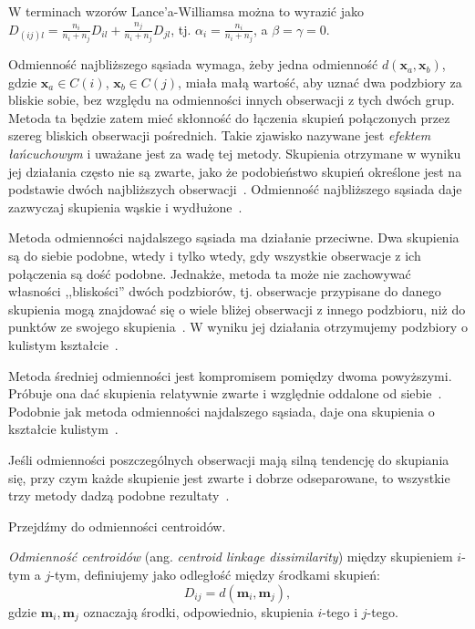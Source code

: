 \documentclass{praca1}
\begin{document}
W terminach wzorów Lance'a-Williamsa można to wyrazić jako $D_{(ij)l} = \frac{n_i}{n_i+n_j} D_{il} + \frac{n_j}{n_i+n_j} D_{jl}$, tj. $\alpha_i = \frac{n_i}{n_i+n_j}$, a $\beta = \gamma = 0$.

Odmienność najbliższego sąsiada wymaga, żeby jedna odmienność $d(\mathbf{x}_a, \mathbf{x}_b)$, gdzie $\mathbf{x}_a \in C(i)$, $\mathbf{x}_b \in C(j)$, miała małą wartość, aby uznać dwa podzbiory za bliskie sobie, bez względu na odmienności innych obserwacji z tych dwóch grup. Metoda ta będzie zatem mieć skłonność do łączenia skupień połączonych przez szereg bliskich obserwacji pośrednich. Takie zjawisko nazywane jest \emph{efektem łańcuchowym} i uważane jest za wadę tej metody. Skupienia otrzymane w wyniku jej działania często nie są zwarte, jako że podobieństwo skupień określone jest na podstawie dwóch najbliższych obserwacji~\cite{Hastie2009:elements}. Odmienność najbliższego sąsiada daje zazwyczaj skupienia wąskie i wydłużone~\cite{Koronacki2005:statystyczne}. 

Metoda odmienności najdalszego sąsiada ma działanie przeciwne. Dwa skupienia są do siebie podobne, wtedy i tylko wtedy, gdy wszystkie obserwacje z ich połączenia są dość podobne. Jednakże, metoda ta może nie zachowywać własności ,,bliskości'' dwóch podzbiorów, tj. obserwacje przypisane do danego skupienia mogą znajdować się o wiele bliżej obserwacji z innego podzbioru, niż do punktów ze swojego skupienia~\cite{Hastie2009:elements}. W wyniku jej działania otrzymujemy podzbiory o kulistym kształcie~\cite{Koronacki2005:statystyczne}.

Metoda średniej odmienności jest kompromisem pomiędzy dwoma powyższymi. Próbuje ona dać skupienia relatywnie zwarte i względnie oddalone od siebie~\cite{Hastie2009:elements}. Podobnie jak metoda odmienności najdalszego sąsiada, daje ona skupienia o kształcie kulistym~\cite{Koronacki2005:statystyczne}.

Jeśli odmienności poszczególnych obserwacji mają silną tendencję do skupiania się, przy czym każde skupienie jest zwarte i dobrze odseparowane, to wszystkie trzy metody dadzą podobne rezultaty~\cite{Hastie2009:elements}.

Przejdźmy do odmienności centroidów.

\begin{definition}
\emph{Odmienność centroidów} (ang. \emph{centroid linkage dissimilarity}) między skupieniem $i$-tym a $j$-tym, definiujemy jako odległość między środkami skupień:
$$
D_{ij} = d(\mathbf{m}_i, \mathbf{m}_j),
$$
gdzie $\mathbf{m}_i, \mathbf{m}_j$ oznaczają środki, odpowiednio, skupienia $i$-tego i $j$-tego.
\end{definition}
\end{document}
